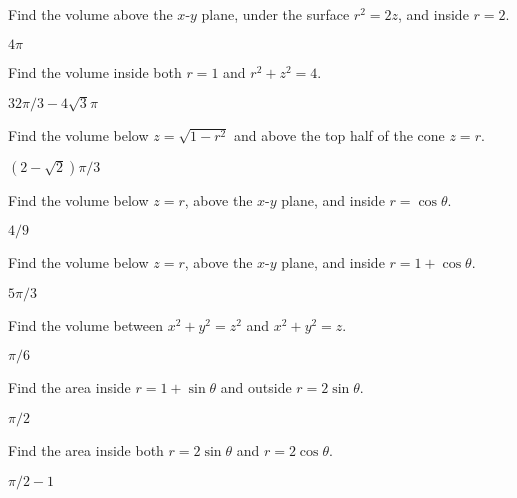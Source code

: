 \begin{exercises}

\begin{exercise} Find the volume above the $x$-$y$ plane, under the surface
$r^2=2z$, and inside $r=2$.
\begin{answer} $4\pi$
\end{answer}\end{exercise}

\begin{exercise} Find the volume inside both $r=1$ and $r^2+z^2=4$.
\begin{answer} $32\pi/3-4\sqrt3\pi$
\end{answer}\end{exercise}

\begin{exercise} Find the volume below $z=\sqrt{1-r^2}$ and above
the top half of the cone $z=r$.
\begin{answer} $(2-\sqrt2)\pi/3$
\end{answer}\end{exercise}

\begin{exercise} Find the volume below  $z=r$, above the $x$-$y$ plane, and
inside $r=\cos\theta$.
\begin{answer} $4/9$
\end{answer}\end{exercise}

\begin{exercise} Find the volume below  $z=r$, above the $x$-$y$ plane, and
inside $r=1+\cos\theta$.
\begin{answer} $5\pi/3$
\end{answer}\end{exercise}

\begin{exercise} Find the volume between $x^2+y^2=z^2$ and $x^2+y^2=z$.
\begin{answer} $\pi/6$
\end{answer}\end{exercise}

\begin{exercise} Find the area inside $r=1+\sin\theta$ and outside
$r=2\sin\theta$. 
\begin{answer} $\pi/2$
\end{answer}\end{exercise}

\begin{exercise} Find the area inside both
$r=2\sin\theta$ and $r=2\cos\theta$. 
\begin{answer} $\pi/2-1$
\end{answer}\end{exercise}


\end{exercises}
